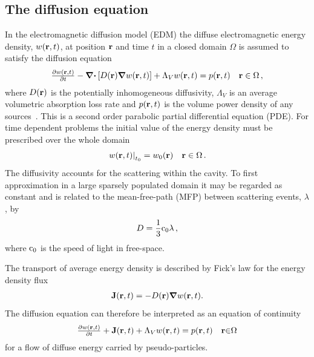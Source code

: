 \documentclass[a4paper]{article}
\numberwithin{equation}{section}
\begin{document}
\subsection[The diffusion equation]{The diffusion equation}
\label{sc:sum:edm}

In the electromagnetic diffusion model (EDM) the diffuse electromagnetic energy
density, $w(\boldsymbol{\mathrm{r}},t)$, at position $\boldsymbol{\mathrm{r}}$ and time $t$ in a closed
domain $\Omega$ is assumed to satisfy the diffusion equation
\begin{align}
\begin{matrix}
\frac{\partial w(\boldsymbol{\mathrm{r}},t)}{\partial t} - \boldsymbol{\mathrm{\nabla}}\boldsymbol{\mathrm{\cdot}}\left[D(\boldsymbol{\mathrm{r}}) \boldsymbol{\mathrm{\nabla}} w(\boldsymbol{\mathrm{r}},t) \right] + \Lambda_V w(\boldsymbol{\mathrm{r}},t) = p(\boldsymbol{\mathrm{r}},t) &\boldsymbol{\mathrm{r}}\in\Omega\,, 
\end{matrix}
\end{align}
where $D(\boldsymbol{\mathrm{r}})$ is the potentially inhomogeneous diffusivity, $\Lambda_V$ is an 
average volumetric absorption loss rate and  $p(\boldsymbol{\mathrm{r}},t)$ is the volume power density 
of any sources~\citep{Picaut1999,Valeau2006,Navarro2015,Savioja2015}. This is a second order parabolic partial differential equation (PDE).
For time dependent problems the initial value of the energy density must be
prescribed over the whole domain
\begin{align}
\begin{matrix}
\left.w(\boldsymbol{\mathrm{r}},t)\right|_{t_0} = w_0(\boldsymbol{\mathrm{r}}) &\boldsymbol{\mathrm{r}}\in\Omega\,.
\end{matrix}
\end{align}
The diffusivity accounts for the scattering within the cavity. To first
approximation in a large sparsely populated domain it may be regarded as constant and 
is related to the mean-free-path (MFP) between scattering events, $\lambda$, by
\begin{align}
D = \frac{1}{3}\mathrm{c}_0\lambda\,,
\end{align}
where $\mathrm{c}_0$ is the speed of light in free-space. 

The transport of average energy density is described by Fick’s law for the
energy density flux
\begin{align}
\boldsymbol{\mathrm{J}}(\boldsymbol{\mathrm{r}},t) = -D(\boldsymbol{\mathrm{r}})\boldsymbol{\mathrm{\nabla}} w(\boldsymbol{\mathrm{r}},t) .
\end{align}
The diffusion equation can therefore be interpreted as an equation of continuity
\begin{align}
\begin{matrix}
\frac{\partial w(\boldsymbol{\mathrm{r}},t)}{\partial t} +\boldsymbol{\mathrm{J}}(\boldsymbol{\mathrm{r}},t) + \Lambda_V w(\boldsymbol{\mathrm{r}},t)= p(\boldsymbol{\mathrm{r}},t) &\boldsymbol{\mathrm{r}}{\in}\Omega
\end{matrix}
\end{align}
for a flow of diffuse energy carried by pseudo-particles.
\end{document}
